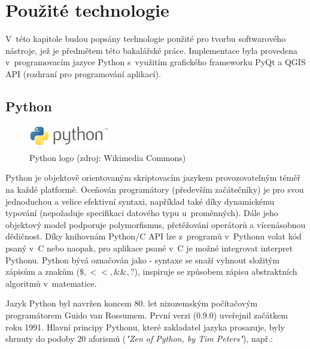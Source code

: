 \chapter{Použité technologie}
\label{3-technologie}

V~této kapitole budou popsány technologie použité pro tvorbu
softwarového nástroje, jež je předmětem této bakalářské
práce. Implementace byla provedena v~programo\-vacím jazyce Python
s~využitím grafického frameworku PyQt a QGIS API (rozhraní pro
programování aplikací).

\section{Python}
\begin{figure}[H] \centering
      \includegraphics[width=100pt]{./pictures/python.png}
      \caption[Python logo]{Python logo (zdroj: Wikimedia Commons)}
      \label{fig:python}
\end{figure}
  
Python je objektově orientovaným skriptovacím jazykem provozovatelným
téměř na každé platformě. Oceňován programátory (především
začátečníky) je pro svou jednoduchou a velice efektivní syntaxi,
například také díky dynamickému typování (nepožaduje specifikaci
datového typu u~proměnných). Dále jeho objektový model podporuje
polymorfismus, přetěžování operátorů a vícenásobnou dědičnost. 
Díky knihovnám Python/C API lze z~programů v~Pythonu
volat kód psaný v~C nebo naopak, pro aplikace psané v~C je možné
integrovat interpret Pythonu.  Python bývá označován jako 
 - syntaxe se snaží vyhnout složitým zápisům a znakům ($\$,
<<, \&\&, ?$), inspiruje se způsobem zápisu abstraktních
algoritmů v~matematice. \cite{learningPython}

Jazyk Python byl navržen koncem 80. let nizozemským počítačovým
programátorem Guido van Rossumem. První verzi (0.9.0) uveřejnil
začátkem roku 1991. Hlavní principy Pythonu, které zakladatel jazyka
prosazuje, byly shrnuty do podoby 20 aforismů (\textit{"Zen of Python,
by Tim Peters"}), např.:

